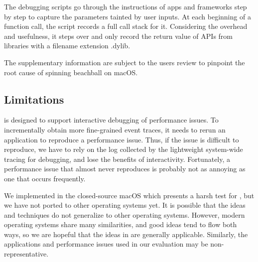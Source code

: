The debugging scripts go through the instructions of apps and frameworks step
by step to capture the parameters tainted by user inputs. At each beginning of
a function call, the script records a full call stack for it. Considering the
overhead and usefulness, it steps over and only record the return value of APIs
from libraries with a filename extension .dylib.

The supplementary information are subject to the users review to pinpoint the
root cause of spinning beachball on macOS.

\subsection{Limitations}
\xxx is designed to support interactive debugging of performance issues. To
incrementally obtain more fine-grained event traces, it needs to rerun an
application to reproduce a performance issue. Thus, if the issue is difficult to
reproduce, we have to rely on the log collected by the lightweight system-wide
tracing for debugging, and lose the benefits of interactivity. Fortunately, a
performance issue that almost never reproduces is probably not as annoying as
one that occurs frequently.

We implemented \xxx in the closed-source macOS which presents a harsh test
for \xxx, but we have not ported \xxx to other operating systems yet. It is
possible that the ideas and techniques do not generalize to other operating
systems. However, modern operating systems share many similarities, and good
ideas tend to flow both ways, so we are hopeful that the ideas in \xxx are
generally applicable. Similarly, the applications and performance issues used in
our evaluation may be non-representative.